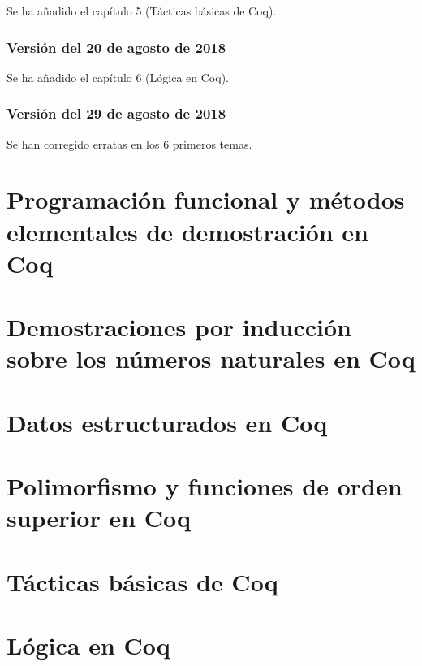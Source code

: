\documentclass[a4paper,12pt,twoside]{book}
\begin{document}
Se ha añadido el capítulo 5 (Tácticas básicas de Coq).

\subsection*{Versión del 20 de agosto de 2018}

Se ha añadido el capítulo 6 (Lógica en Coq).

\subsection*{Versión del 29 de agosto de 2018}

Se han corregido erratas en los 6 primeros temas.

\chapter{Programación funcional y métodos elementales de demostración en Coq}

\chapter{Demostraciones por inducción sobre los números naturales en Coq}

\chapter{Datos estructurados en Coq}

\chapter{Polimorfismo y funciones de orden superior en Coq}

\chapter{Tácticas básicas de Coq}

\chapter{Lógica en Coq}

% 
\end{document}
